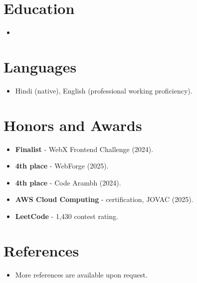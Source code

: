 \documentclass[11pt,a4paper,sans]{moderncv}
\begin{document}

\section{Education}
\vspace{1pt}
\begin{itemize}

\item{}

\end{itemize}


\section{Languages}
\vspace{1pt}
\begin{itemize}
\item {Hindi (native), English (professional working proficiency).}
\end{itemize}


\section{Honors and Awards}
\vspace{1pt}
\begin{itemize}
\item{\textbf{Finalist} - WebX Frontend Challenge (2024).}
\item{\textbf{4th place} - WebForge (2025).}
\item{\textbf{4th place} - Code Arambh (2024).}
\item{\textbf{AWS Cloud Computing} - certification, JOVAC (2025).}
\item{\textbf{LeetCode} - 1,430 contest rating.}
\end{itemize}


\section{References}
\vspace{1pt}
\begin{itemize}
\item{More references are available upon request.}
\end{itemize}
\end{document}
